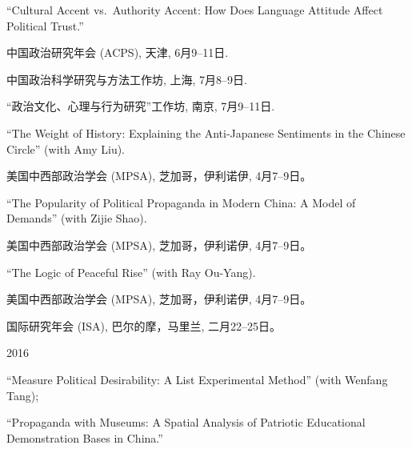 \documentclass[10.5pt,]{article}
\providecommand{\tightlist}{%
	\setlength{\itemsep}{0pt}\setlength{\parskip}{0pt}}
\renewenvironment{itemize}{
	\begin{list}{}{
			\setlength{\leftmargin}{1.5em}
		}
	}{
	\end{list}
}
\begin{document}
\begin{itemize}
   \begin{itemize}
   \tightlist
   \item
     ``Cultural Accent vs.~Authority Accent: How Does Language Attitude
     Affect Political Trust.''

     \begin{itemize}
     \tightlist
     \item
       \footnotesize 中国政治研究年会 (ACPS), 天津, 6月9--11日.
     \item
       \footnotesize 中国政治科学研究与方法工作坊, 上海, 7月8--9日.
     \item
       \footnotesize ``政治文化、心理与行为研究''工作坊, 南京,
       7月9--11日.
     \end{itemize}
   \item
     ``The Weight of History: Explaining the Anti-Japanese Sentiments in
     the Chinese Circle'' (with Amy Liu).

     \begin{itemize}
     \tightlist
     \item
       \footnotesize 美国中西部政治学会 (MPSA), 芝加哥，伊利诺伊,
       4月7--9日。
     \end{itemize}
   \item
     ``The Popularity of Political Propaganda in Modern China: A Model
     of Demands'' (with Zijie Shao).

     \begin{itemize}
     \tightlist
     \item
       \footnotesize 美国中西部政治学会 (MPSA), 芝加哥，伊利诺伊,
       4月7--9日。
     \end{itemize}
   \item
     ``The Logic of Peaceful Rise'' (with Ray Ou-Yang).

     \begin{itemize}
     \tightlist
     \item
       \footnotesize 美国中西部政治学会 (MPSA), 芝加哥，伊利诺伊,
       4月7--9日。
     \item
       \footnotesize 国际研究年会 (ISA), 巴尔的摩，马里兰,
       二月22--25日。
     \end{itemize}
   \end{itemize}
 \item
   2016

   \begin{itemize}
   \tightlist
   \item
     ``Measure Political Desirability: A List Experimental Method''
     (with Wenfang Tang);
   \item
     ``Propaganda with Museums: A Spatial Analysis of Patriotic
     Educational Demonstration Bases in China.''


\end{itemize}
\end{itemize}
\end{document}
